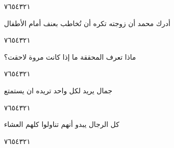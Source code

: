 \documentclass[11pt, a4paper]{article}
\begin{document}
{\begin{center}
        \hfill\textarabic{٧}\hfill\textarabic{٦}\hfill\textarabic{٥}\hfill\textarabic{٤}\hfill\textarabic{٣}\hfill\textarabic{٢}\hfill\textarabic{١}
        \end{center}
		
\vfill\clearpage

\vspace{0.5\baselineskip}\begin{flushright}
\textarabic{أدرك محمد أن زوجته تكره أن تُخاطب بعنف أمام الأطفال}
\end{flushright}

\begin{center}
        \hfill\textarabic{٧}\hfill\textarabic{٦}\hfill\textarabic{٥}\hfill\textarabic{٤}\hfill\textarabic{٣}\hfill\textarabic{٢}\hfill\textarabic{١}
        \end{center}


\vspace{0.5\baselineskip}\begin{flushright}
\textarabic{ماذا تعرف المحققة ما إذا كانت مروة لاحقت؟}
\end{flushright}

\begin{center}
        \hfill\textarabic{٧}\hfill\textarabic{٦}\hfill\textarabic{٥}\hfill\textarabic{٤}\hfill\textarabic{٣}\hfill\textarabic{٢}\hfill\textarabic{١}
        \end{center}


\vspace{0.5\baselineskip}\begin{flushright}
\textarabic{جمال يريد لكل واحد تريده ان يستمتع}
\end{flushright}

\begin{center}
        \hfill\textarabic{٧}\hfill\textarabic{٦}\hfill\textarabic{٥}\hfill\textarabic{٤}\hfill\textarabic{٣}\hfill\textarabic{٢}\hfill\textarabic{١}
        \end{center}


\vspace{0.5\baselineskip}\begin{flushright}
\textarabic{كل الرجال يبدو أنهم تناولوا كلهم العشاء}
\end{flushright}

\begin{center}
        \hfill\textarabic{٧}\hfill\textarabic{٦}\hfill\textarabic{٥}\hfill\textarabic{٤}\hfill\textarabic{٣}\hfill\textarabic{٢}\hfill\textarabic{١}
        \end{center}


}
\end{document}
